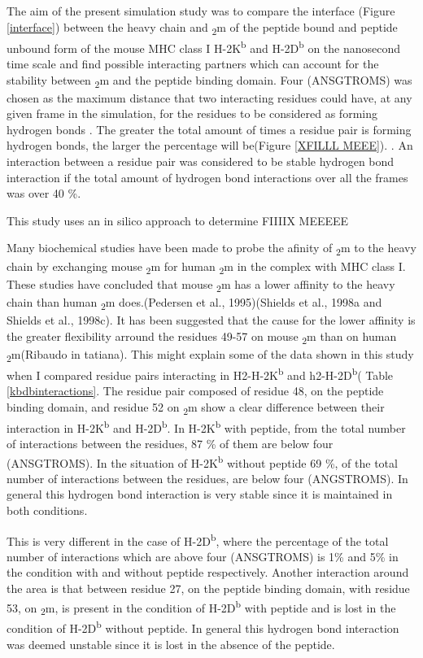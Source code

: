 \documentclass[11pt,twocolumn]{article}
\newcommand{\db}{H-2D\textsuperscript{b}\xspace}
\newcommand{\kb}{H-2K\textsuperscript{b}\xspace}
\newcommand{\btm}{\textbeta\textsubscript{2}m\xspace}
\begin{document}
The aim of the present simulation study was to compare the interface (Figure \ref{interface}) between the heavy chain and \btm of the peptide bound and peptide unbound form of the mouse MHC class I \kb and \db on the nanosecond time scale and find possible interacting partners which can account for the stability between \btm and the peptide binding domain. Four (ANSGTROMS) was chosen as the maximum distance that two interacting residues could have, at any given frame in the simulation, for the residues to be considered as forming hydrogen bonds \cite{McDonald1994777}. The greater the total amount of times a residue pair is forming hydrogen bonds, the larger the percentage will be(Figure \ref{XFILLL MEEE}). . An interaction  between a residue pair was considered to be stable hydrogen bond interaction if the total amount of hydrogen bond interactions over all the frames was over 40 \%. 

This study uses an in silico approach to determine FIIIIX MEEEEE


Many biochemical studies have been made to probe the afinity of \btm to the heavy chain by exchanging mouse \btm for human \btm in the complex with MHC class I. These studies have concluded that mouse \btm has a lower affinity to the heavy chain than human \btm does.(Pedersen et al., 1995)(Shields et al., 1998a and Shields et al., 1998c). It has been suggested that the cause for the lower affinity is the greater flexibility arround the residues 49-57 on mouse \btm than on human \btm (Ribaudo in tatiana). This might explain some of the data shown in this study when I compared residue pairs interacting in H2-\kb and h2-\db ( Table \ref{kbdbinteractions}. The residue pair composed of residue 48, on the peptide binding domain, and residue 52 on \btm show a clear difference between their interaction in \kb and \db. In \kb with peptide, from the total number of interactions between the residues, 87 \% of them are below four (ANSGTROMS). In the situation of \kb without peptide 69 \%, of the total number of interactions between the residues, are below four (ANGSTROMS). In general this hydrogen bond interaction is very stable since it is maintained in both conditions.

This is very different in the case of \db, where the percentage of the total number of interactions which are above four (ANSGTROMS) is 1\% and 5\% in the condition with and without peptide respectively. Another interaction around the area is that between  residue 27, on the peptide binding domain, with residue 53, on \btm, is present in the condition of \db with peptide and is lost in the condition of \db without peptide. In general this hydrogen bond interaction was deemed unstable since it is lost in the absence of the peptide.  
\end{document}
